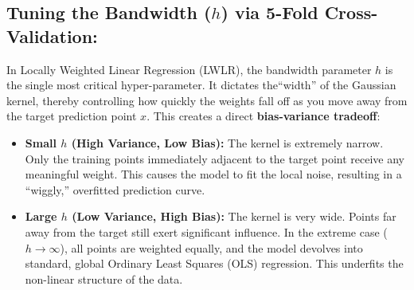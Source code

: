 \documentclass[twoside, 10pt]{article}
\begin{document}
\subsection{Tuning the Bandwidth (\texorpdfstring{$h$}{h}) via 5-Fold Cross-Validation:}
In Locally Weighted Linear Regression (LWLR), the bandwidth parameter $h$ is the single most critical hyper-parameter. It dictates the``width'' of the Gaussian kernel, thereby controlling how quickly the weights fall off as you move away from the target prediction point $x$. 
This creates a direct \textbf{bias-variance tradeoff}:
\begin{itemize}
    \item \textbf{Small $h$ (High Variance, Low Bias):} The kernel is extremely narrow. Only the training points immediately adjacent to the target point receive any meaningful weight. This causes the model to fit the local noise, resulting in a ``wiggly,'' overfitted prediction curve.
    \item \textbf{Large $h$ (Low Variance, High Bias):} The kernel is very wide. Points far away from the target still exert significant influence. In the extreme case ($h \to \infty$), all points are weighted equally, and the model devolves into standard, global Ordinary Least Squares (OLS) regression. This underfits the non-linear structure of the data.
\end{itemize}
\end{document}

